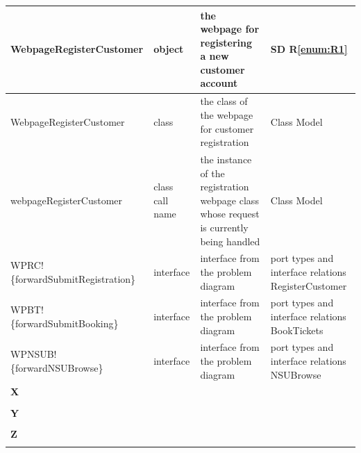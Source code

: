 \documentclass[a4paper,10pt,titlepage,bibtotoc,bibtotocnumbered]{scrreprt}
\begin{document}
\begin{longtable}{|p{.4\linewidth}|p{.2\linewidth}|p{.2\linewidth}|p{.2\linewidth}|}
\hline
WebpageRegisterCustomer & object & the webpage for registering a new customer account & SD R\ref{enum:R1}\\
\hline
WebpageRegisterCustomer & class & the class of the webpage for customer registration & Class Model\\
\hline
webpageRegisterCustomer & class call name & the instance of the registration webpage class whose request is currently being handled & Class Model\\
\hline
WPRC!\{forwardSubmitRegistration\} & interface & interface from the problem diagram & port types and interface relations RegisterCustomer\\
\hline
WPBT!\{forwardSubmitBooking\} & interface & interface from the problem diagram & port types and interface relations BookTickets\\
\hline
WPNSUB!\{forwardNSUBrowse\} & interface & interface from the problem diagram & port types and interface relations NSUBrowse\\
\hline
\multicolumn{4}{|l|}{\textbf{X}}\\
\hline
&  &  & \\
\hline
\multicolumn{4}{|l|}{\textbf{Y}}\\
\hline
&  &  & \\
\hline
\multicolumn{4}{|l|}{\textbf{Z}}\\
\hline
&  &  & \\
\hline
\end{longtable}
\end{document}
